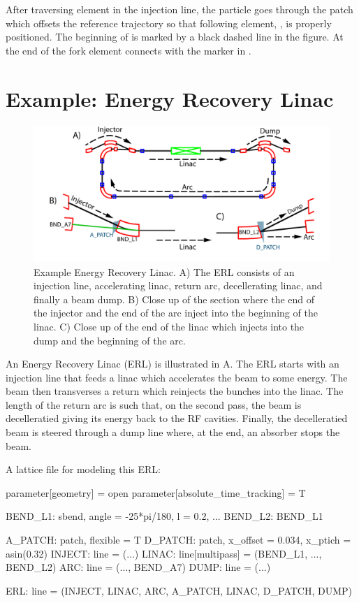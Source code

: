 After traversing element  in the injection line, the particle
goes through the patch  which offsets the reference trajectory
so that following element, , is properly positioned.  The
beginning of  is marked by a black dashed line in the figure.
At the end of  the fork element  connects 
with the marker  in .

\section{Example: Energy Recovery Linac}
\label{s:ex.erl}

\begin{figure}[tb]
  \centering
  \includegraphics[width=6in]{erl.pdf}
  \caption[Example Energy Recovery Linac.]{
Example Energy Recovery Linac. A) The ERL consists of an injection
line, accelerating linac, return arc, decellerating linac, and finally
a beam dump. B) Close up of the section where the end of the injector
and the end of the arc inject into the beginning of the linac. C)
Close up of the end of the linac which injects into the dump and the
beginning of the arc.}
  \label{f:erl}
\end{figure}

An Energy Recovery Linac (ERL) is illustrated in A. The ERL
starts with an injection line that feeds a linac which accelerates the
beam to some energy. The beam then transverses a return  which
reinjects the bunches into the linac. The length of the return arc is
such that, on the second pass, the beam is decelleratied giving its
energy back to the RF cavities. Finally, the decelleratied beam is
steered through a dump line where, at the end, an absorber stops the
beam.

 A lattice file for modeling this ERL:
\begin{example}
  parameter[geometry] = open
  parameter[absolute_time_tracking] = T

  BEND_L1: sbend, angle = -25*pi/180, l = 0.2, ...
  BEND_L2: BEND_L1

  A_PATCH: patch, flexible = T
  D_PATCH: patch, x_offset = 0.034, x_ptich = asin(0.32) 
  INJECT: line = (...)
  LINAC: line[multipass] = (BEND_L1, ..., BEND_L2)
  ARC: line = (..., BEND_A7)
  DUMP: line = (...)

  ERL: line = (INJECT, LINAC, ARC, A_PATCH, LINAC, D_PATCH, DUMP)
\end{example}


